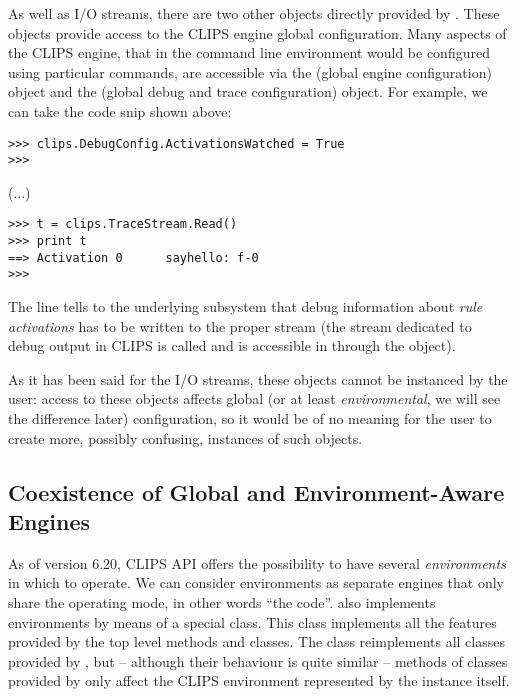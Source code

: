 As well as I/O streams, there are two other objects directly provided
by \pyclips{}. These objects provide access to the CLIPS engine global
configuration. Many aspects of the CLIPS engine, that in the command
line environment would be configured using particular commands, are
accessible via the  (global engine configuration)
object and the  (global debug and trace configuration)
object. For example, we can take the code snip shown above:

\begin{verbatim}
>>> clips.DebugConfig.ActivationsWatched = True
>>>
\end{verbatim}
(...)
\begin{verbatim}
>>> t = clips.TraceStream.Read()
>>> print t
==> Activation 0      sayhello: f-0
>>>
\end{verbatim}

The  line tells to the
underlying subsystem that debug information about \emph{rule activations}
has to be written to the proper stream (the stream dedicated to debug
output in CLIPS is called  and is accessible in \pyclips{}
through the  object).

As it has been said for the I/O streams, these objects cannot be instanced
by the user: access to these objects affects global (or at least
\emph{environmental}, we will see the difference later) configuration,
so it would be of no meaning for the user to create more, possibly
confusing, instances of such objects.


\subsection{Coexistence of Global and Environment-Aware Engines\label{pyclips-ov-env}}

As of version 6.20, CLIPS API offers the possibility to have several
\emph{environments} in which to operate. We can consider environments as
separate engines that only share the operating mode, in other words
``the code''. \pyclips{} also implements environments by means of a special
 class. This class implements all the features
provided by the top level methods and classes. The 
class reimplements all classes provided by \pyclips{}, but -- although
their behaviour is quite similar -- methods of classes provided by
 only affect the CLIPS environment represented by the
 instance itself.

